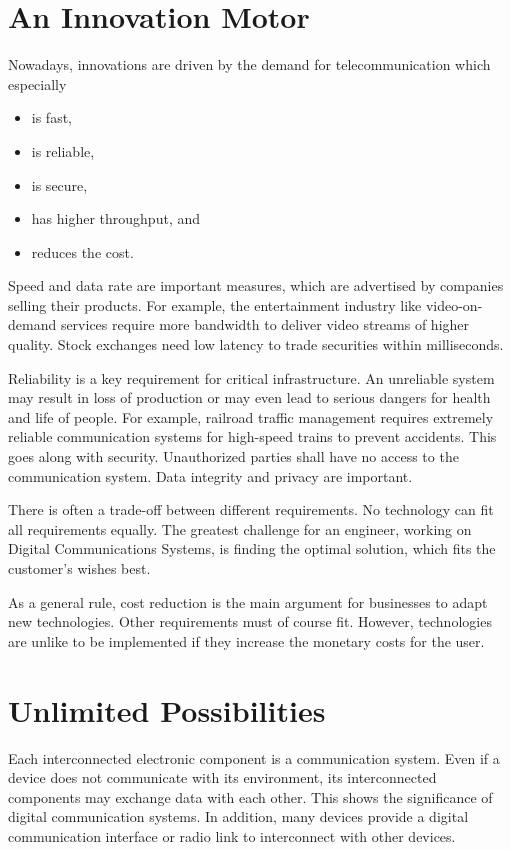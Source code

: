 \section*{An Innovation Motor}

Nowadays, innovations are driven by the demand for telecommunication which especially
\begin{itemize}
	\item is fast,
	\item is reliable,
	\item is secure,
	\item has higher throughput, and
	\item reduces the cost.
\end{itemize}

Speed and data rate are important measures, which are advertised by companies selling their products. For example, the entertainment industry like video-on-demand services require more bandwidth to deliver video streams of higher quality. Stock exchanges need low latency to trade securities within milliseconds.

Reliability is a key requirement for critical infrastructure. An unreliable system may result in loss of production or may even lead to serious dangers for health and life of people. For example, railroad traffic management requires extremely reliable communication systems for high-speed trains to prevent accidents. This goes along with security. Unauthorized parties shall have no access to the communication system. Data integrity and privacy are important.

There is often a trade-off between different requirements. No technology can fit all requirements equally. The greatest challenge for an engineer, working on Digital Communications Systems, is finding the optimal solution, which fits the customer's wishes best.

As a general rule, cost reduction is the main argument for businesses to adapt new technologies. Other requirements must of course fit. However, technologies are unlike to be implemented if they increase the monetary costs for the user.


\section*{Unlimited Possibilities}

Each interconnected electronic component is a communication system. Even if a device does not communicate with its environment, its interconnected components may exchange data with each other. This shows the significance of digital communication systems. In addition, many devices provide a digital communication interface or radio link to interconnect with other devices.

